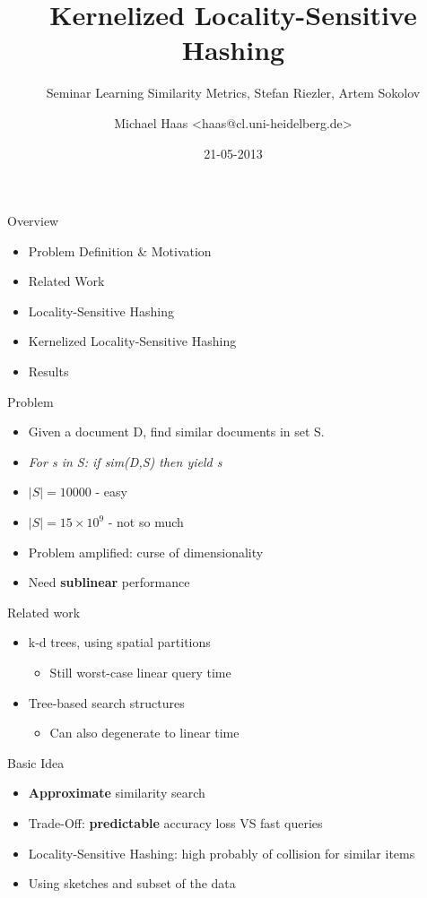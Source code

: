 \documentclass[12pt,a4paper]{beamer}
\author{Michael Haas <haas@cl.uni-heidelberg.de>}
\title{Kernelized Locality-Sensitive Hashing}
\subtitle{Seminar Learning Similarity Metrics, Stefan Riezler, Artem Sokolov}
\date{21-05-2013}
\begin{document}
\begin{frame}
\maketitle
\end{frame}

\begin{frame}{Overview}
\begin{itemize}
\item Problem Definition \& Motivation
\item Related Work
\item Locality-Sensitive Hashing
\item Kernelized Locality-Sensitive Hashing
\item Results
\end{itemize}
\end{frame}

\begin{frame}{Problem}
\begin{itemize}
\item Given a document D, find similar documents in set S.
\item \textit{For s in S: if sim(D,S) then yield s}
\item $|S| = 10000$ - easy
\item $|S| = 15 \times 10^9$ - not so much
\item Problem amplified: curse of dimensionality
\item Need \textbf{sublinear} performance
\end{itemize}
\end{frame}

\begin{frame}{Related work}
\begin{itemize}
\item k-d trees, using spatial partitions
    \begin{itemize}
    \item Still worst-case linear query time
    \end{itemize}
\item Tree-based search structures
    \begin{itemize}
    \item Can also degenerate to linear time
    \end{itemize}
\end{itemize}
\end{frame}

\begin{frame}{Basic Idea}
\begin{itemize}
\item \textbf{Approximate} similarity search
\item Trade-Off: \textbf{predictable} accuracy loss VS fast queries
\item Locality-Sensitive Hashing: high probably of collision for similar items
\item Using sketches and subset of the data
\end{itemize}
\end{frame}
\end{document}
